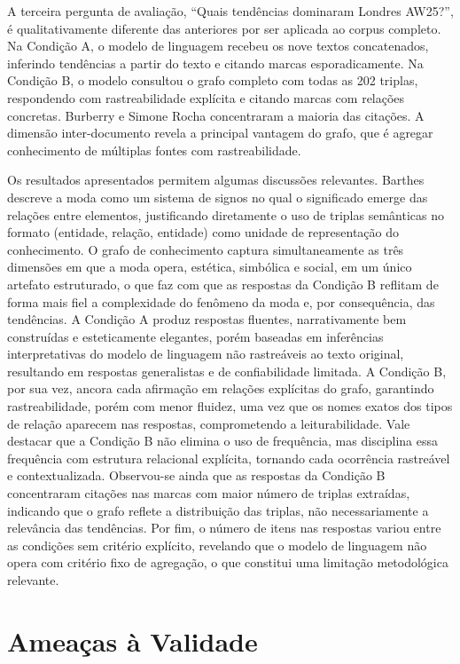 \documentclass[sigconf]{acmart}
\begin{document}
A terceira pergunta de avaliação, ``Quais tendências dominaram Londres AW25?'', é qualitativamente diferente das anteriores por ser aplicada ao corpus completo. Na Condição A, o modelo de linguagem recebeu os nove textos concatenados, inferindo tendências a partir do texto e citando marcas esporadicamente. Na Condição B, o modelo consultou o grafo completo com todas as 202 triplas, respondendo com rastreabilidade explícita e citando marcas com relações concretas. Burberry e Simone Rocha concentraram a maioria das citações. A dimensão inter-documento revela a principal vantagem do grafo, que é agregar conhecimento de múltiplas fontes com rastreabilidade.

Os resultados apresentados permitem algumas discussões relevantes. Barthes descreve a moda como um sistema de signos no qual o significado emerge das relações entre elementos, justificando diretamente o uso de triplas semânticas no formato (entidade, relação, entidade) como unidade de representação do conhecimento. O grafo de conhecimento captura simultaneamente as três dimensões em que a moda opera, estética, simbólica e social, em um único artefato estruturado, o que faz com que as respostas da Condição B reflitam de forma mais fiel a complexidade do fenômeno da moda e, por consequência, das tendências. A Condição A produz respostas fluentes, narrativamente bem construídas e esteticamente elegantes, porém baseadas em inferências interpretativas do modelo de linguagem não rastreáveis ao texto original, resultando em respostas generalistas e de confiabilidade limitada. A Condição B, por sua vez, ancora cada afirmação em relações explícitas do grafo, garantindo rastreabilidade, porém com menor fluidez, uma vez que os nomes exatos dos tipos de relação aparecem nas respostas, comprometendo a leiturabilidade. Vale destacar que a Condição B não elimina o uso de frequência, mas disciplina essa frequência com estrutura relacional explícita, tornando cada ocorrência rastreável e contextualizada. Observou-se ainda que as respostas da Condição B concentraram citações nas marcas com maior número de triplas extraídas, indicando que o grafo reflete a distribuição das triplas, não necessariamente a relevância das tendências. Por fim, o número de itens nas respostas variou entre as condições sem critério explícito, revelando que o modelo de linguagem não opera com critério fixo de agregação, o que constitui uma limitação metodológica relevante.

\section{Ameaças à Validade}
\label{sec:ameacas}
\end{document}
